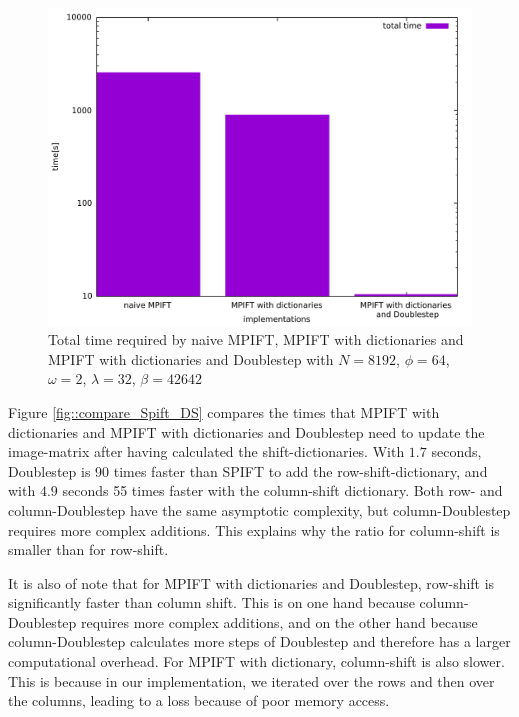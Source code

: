\documentclass[12pt]{article}
\begin{document}
\begin{figure}[H]
	\includegraphics[width=380pt]{comp}
	\caption{Total time required by naive MPIFT, MPIFT with dictionaries and MPIFT with dictionaries and Doublestep
	\label{fig::compare_implementations_exp } with $N=8192$, $\phi=64$, $\omega=2$, $\lambda=32$, $\beta=42642$}
\end{figure}

Figure \ref{fig::compare_Spift_DS} compares the times that MPIFT with dictionaries and MPIFT with dictionaries and Doublestep need to update the image-matrix after having calculated the shift-dictionaries. With $1.7$ seconds, Doublestep is 90 times faster than SPIFT to add the row-shift-dictionary, and with $4.9$ seconds 55 times faster with the column-shift dictionary. Both row- and column-Doublestep have the same asymptotic complexity, but column-Doublestep requires more complex additions. This explains why the ratio for column-shift is smaller than for row-shift.

It is also of note that for MPIFT with dictionaries and Doublestep, row-shift is significantly faster than column shift. This is on one hand because column-Doublestep requires more complex additions, and on the other hand because column-Doublestep calculates more steps of Doublestep and therefore has a larger computational overhead. For MPIFT with dictionary, column-shift is also slower. This is because in our implementation, we iterated over the rows and then over the columns, leading to a loss because of poor memory access.
\end{document}
